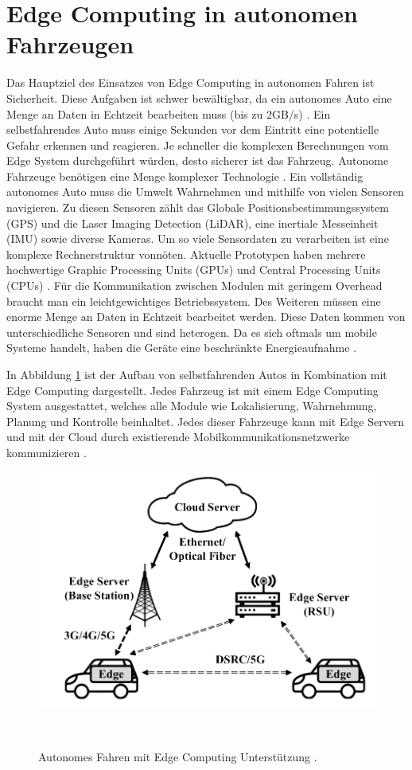 \documentclass{sigchi}
\begin{document}
\section{Edge Computing in autonomen Fahrzeugen} \label{chap:edge-computing-autonomic-cars}
Das Hauptziel des Einsatzes von Edge Computing in autonomen Fahren ist Sicherheit. Diese Aufgaben ist schwer bewältigbar, da ein autonomes Auto eine Menge an Daten in Echtzeit bearbeiten muss (bis zu 2GB/s) \cite{architectures:2017}. Ein selbstfahrendes Auto muss einige Sekunden vor dem Eintritt eine potentielle Gefahr erkennen und reagieren. Je schneller die komplexen Berechnungen vom Edge System durchgeführt würden, desto sicherer ist das Fahrzeug. Autonome Fahrzeuge benötigen eine Menge komplexer Technologie \cite{opportunities-challenges:2019}.
Ein vollständig autonomes Auto muss die Umwelt Wahrnehmen und mithilfe von vielen Sensoren navigieren. Zu diesen Sensoren zählt das Globale Positionsbestimmungssystem (GPS) und die Laser Imaging Detection (LiDAR), eine inertiale Messeinheit (IMU) sowie diverse Kameras. Um so viele Sensordaten zu verarbeiten ist eine komplexe Rechnerstruktur vonnöten. Aktuelle Prototypen haben mehrere hochwertige Graphic Processing Units (GPUs) und Central Processing Units (CPUs) \cite{architectures:2017}. Für die Kommunikation zwischen Modulen mit geringem Overhead braucht man ein leichtgewichtiges Betriebssystem. Des Weiteren müssen eine enorme Menge an Daten in Echtzeit bearbeitet werden. Diese Daten kommen von unterschiedliche Sensoren und sind heterogen. Da es sich oftmals um mobile Systeme handelt, haben die Geräte eine beschränkte Energieaufnahme \cite{opportunities-challenges:2019}. 

In Abbildung \ref{fig:edge-computing-drive-infrastructure} ist der Aufbau von selbstfahrenden Autos in Kombination mit Edge Computing dargestellt. Jedes Fahrzeug ist mit einem Edge Computing System ausgestattet, welches alle Module wie Lokalisierung, Wahrnehmung, Planung und Kontrolle beinhaltet. Jedes dieser Fahrzeuge kann mit Edge Servern und mit der Cloud durch existierende Mobilkommunikationsnetzwerke kommunizieren \cite{opportunities-challenges:2019}.

\begin{figure}
\centering
  \includegraphics[width=0.75\columnwidth]{figures/edge-computing-drive-infrastructure.PNG}
  \caption{Autonomes Fahren mit Edge Computing Unterstützung \cite{opportunities-challenges:2019}.}~\label{fig:edge-computing-drive-infrastructure}
\end{figure}
\end{document}
